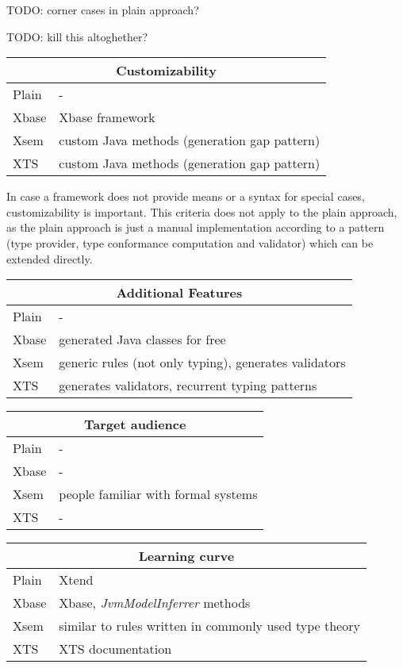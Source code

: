 TODO: corner cases in plain approach?

TODO: kill this altoghether?
 
\begin{tabularx}{\linewidth}{ l   X }
\multicolumn{2}{c}{Customizability} \\ \hline
Plain & - \\
Xbase & Xbase framework \\
Xsem & custom Java methods (generation gap pattern)\\
XTS & custom Java methods (generation gap pattern) \\
\end{tabularx}

In case a framework does not provide means or a syntax for special cases,
customizability is important. This criteria does not apply to the plain
approach, as the plain approach is just a manual implementation according to a
pattern (type provider, type conformance computation and validator) which can be
extended directly. 

\begin{tabularx}{\linewidth}{ l   X }
\multicolumn{2}{c}{Additional Features} \\ \hline
Plain & - \\
Xbase & generated Java classes for free \\
Xsem & generic rules (not only typing), generates validators \\
XTS & generates validators, recurrent typing patterns \\
\end{tabularx}

\begin{tabularx}{\linewidth}{ l   X }
\multicolumn{2}{c}{Target audience} \\ \hline
Plain & - \\
Xbase & - \\
Xsem & people familiar with formal systems \\
XTS & - \\
\end{tabularx}

\begin{tabularx}{\linewidth}{ l   X }
\multicolumn{2}{c}{Learning curve} \\ \hline
Plain & Xtend \\
Xbase & Xbase, \emph{JvmModelInferrer} methods \\
Xsem & similar to rules written in commonly used type theory \\
XTS & XTS documentation \\
\end{tabularx}

